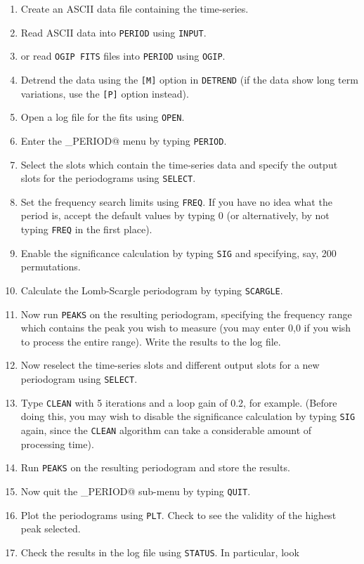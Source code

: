 \documentclass[twoside,11pt,noabs,nolof]{starlink}
\begin{document}
\begin{enumerate}
\item Create an ASCII data file containing the time-series.
\item Read ASCII data into \texttt{PERIOD} using \texttt{INPUT}.
\item or read \texttt{OGIP FITS} files into \texttt{PERIOD} using \texttt{OGIP}.
\item Detrend the data using the \texttt{[M]} option in \texttt{DETREND} (if the
data show long term variations, use the \texttt{[P]} option instead).
\item Open a log file for the fits using \texttt{OPEN}.
\item Enter the \verb@PERIOD_PERIOD@ menu by typing \texttt{PERIOD}.
\item Select the slots which contain the time-series data and specify the output
slots for the periodograms using \texttt{SELECT}.
\item Set the frequency search limits using \texttt{FREQ}. If you have no idea
what the period is, accept the default values by typing 0 (or alternatively,
by not typing \texttt{FREQ} in the first place).
\item Enable the significance calculation by typing \texttt{SIG} and specifying,
say, 200 permutations.
\item Calculate the Lomb-Scargle periodogram by typing \texttt{SCARGLE}.
\item Now run \texttt{PEAKS} on the resulting periodogram, specifying the
frequency range which contains the peak you wish to measure (you may enter 0,0
if you wish to process the entire range). Write the results to the log file.
\item Now reselect the time-series slots and different output slots for a new
periodogram using \texttt{SELECT}.
\item Type \texttt{CLEAN} with 5 iterations and a loop gain of 0.2, for example.
(Before doing this, you may wish to disable the significance calculation by
typing \texttt{SIG} again, since the \texttt{CLEAN} algorithm can take a
considerable amount of processing time).
\item Run \texttt{PEAKS} on the resulting periodogram and store the results.
\item Now quit the \verb@PERIOD_PERIOD@ sub-menu by typing \texttt{QUIT}.
\item Plot the periodograms using \texttt{PLT}. Check to see the validity of the
highest peak selected.
\item Check the results in the log file using \texttt{STATUS}. In particular, look

\end{enumerate}
\end{document}
